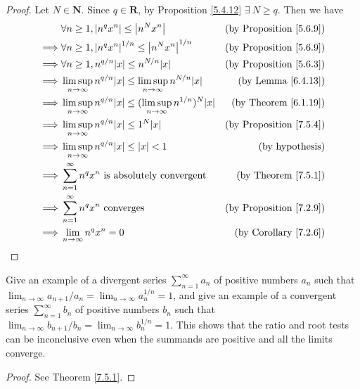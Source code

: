 \begin{proof}
    Let \(N \in \mathbf{N}\).
    Since \(q \in \mathbf{R}\), by Proposition \ref{5.4.12} \(\exists\ N \geq q\).
    Then we have
    \begin{align*}
                 & \forall n \geq 1, \abs*{n^q x^n} \leq \abs*{n^N x^n}                                         & \text{(by Proposition \ref{5.6.9})} \\
        \implies & \forall n \geq 1, \abs*{n^q x^n}^{1 / n} \leq \abs*{n^N x^n}^{1 / n}                         & \text{(by Proposition \ref{5.6.9})} \\
        \implies & \forall n \geq 1, n^{q / n} \abs*{x} \leq n^{N / n} \abs*{x}                                 & \text{(by Proposition \ref{5.6.3})} \\
        \implies & \limsup_{n \to \infty} n^{q / n} \abs*{x} \leq \limsup_{n \to \infty} n^{N / n} \abs*{x}     & \text{(by Lemma \ref{6.4.13})}      \\
        \implies & \limsup_{n \to \infty} n^{q / n} \abs*{x} \leq (\limsup_{n \to \infty} n^{1 / n})^N \abs*{x} & \text{(by Theorem \ref{6.1.19})}    \\
        \implies & \limsup_{n \to \infty} n^{q / n} \abs*{x} \leq 1^N \abs*{x}                                  & \text{(by Proposition \ref{7.5.4})} \\
        \implies & \limsup_{n \to \infty} n^{q / n} \abs*{x} \leq \abs*{x} < 1                                  & \text{(by hypothesis)}              \\
        \implies & \sum_{n = 1}^\infty n^q x^n \text{ is absolutely convergent}                                 & \text{(by Theorem \ref{7.5.1})}     \\
        \implies & \sum_{n = 1}^\infty n^q x^n \text{ converges}                                                & \text{(by Proposition \ref{7.2.9})} \\
        \implies & \lim_{n \to \infty} n^q x^n = 0                                                              & \text{(by Corollary \ref{7.2.6})}
    \end{align*}
\end{proof}

\begin{exercise}\label{ex 7.5.3}
    Give an example of a divergent series \(\sum_{n = 1}^\infty a_n\) of positive numbers \(a_n\) such that \(\lim_{n \to \infty} a_{n + 1} / a_n = \lim_{n \to \infty} a_n^{1 / n} = 1\), and give an example of a convergent series \(\sum_{n = 1}^\infty b_n\) of positive numbers \(b_n\) such that \(\lim_{n \to \infty} b_{n + 1} / b_n = \lim_{n \to \infty} b_n^{1 / n} = 1\).
    This shows that the ratio and root tests can be inconclusive even when the summands are positive and all the limits converge.
\end{exercise}

\begin{proof}
    See Theorem \ref{7.5.1}.
\end{proof}